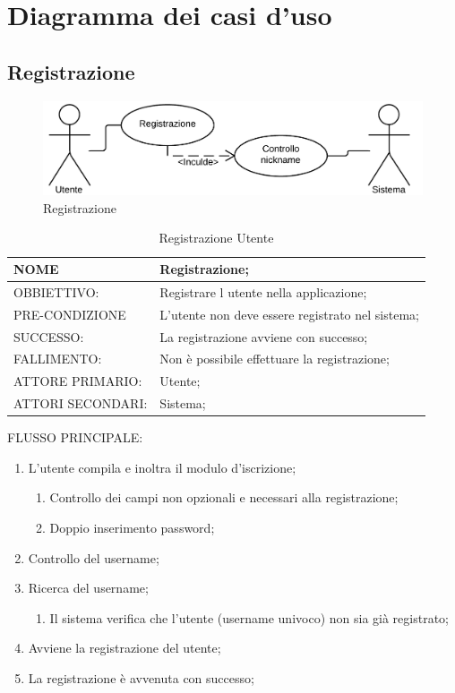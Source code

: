 \chapter{Diagramma dei casi d'uso}

\section{Registrazione}
\begin{figure}[h!]
\centering
\includegraphics[scale=0.30]{img/use/Reg.png}
\caption{Registrazione}
\label{fig:registrazione}
\end{figure}
\begin{table}[H]
\begin{tabular}{p{}|p{}}
\toprule
NOME & Registrazione;\\
\hline
OBBIETTIVO: & Registrare l utente nella applicazione;\\
\hline
PRE-CONDIZIONE & L'utente non deve essere registrato nel sistema;\\
\hline
SUCCESSO: & La registrazione avviene con successo;\\
\hline
FALLIMENTO: & Non è possibile effettuare la registrazione; \\
\hline
ATTORE PRIMARIO: & Utente;\\
\hline
ATTORI SECONDARI: & Sistema;\\
\bottomrule
\end{tabular}
\caption{Registrazione Utente}
\label{table:reg}
\end{table}
FLUSSO PRINCIPALE:
\begin{enumerate}
\item L'utente compila e inoltra il modulo d'iscrizione;
\begin{enumerate}
\item Controllo dei campi non opzionali e necessari alla registrazione;
\item Doppio inserimento password;
\end{enumerate}
\item Controllo del username;
\item Ricerca del username;
\begin{enumerate}
\item Il sistema verifica che l'utente (username univoco) non sia già registrato;
\end{enumerate}
\item Avviene la registrazione del utente;
\item La registrazione è avvenuta con successo;
\end{enumerate}

